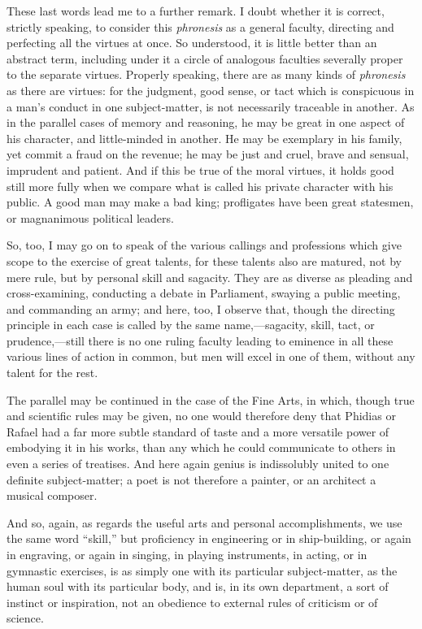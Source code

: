 These last words lead me to a further remark. I doubt whether it is
correct, strictly speaking, to consider this \emph{phronesis} as a
general faculty, directing and perfecting all the virtues at once. So
understood, it is little better than an abstract term, including under
it a circle of analogous faculties severally proper to the separate
virtues. Properly speaking, there are as many kinds of \emph{phronesis}
as there are virtues: for the judgment, good sense, or tact
which is conspicuous in a man's conduct in one subject-matter, is not
necessarily traceable in another. As in the parallel cases of memory
and reasoning, he may be great in one aspect of his character, and
little-minded in another. He may be exemplary in his family, yet
commit a fraud on the revenue; he may be just and cruel, brave and
sensual, imprudent and patient. And if this be true of the moral
virtues, it holds good still more fully when we compare what is called
his private character with his public. A good man may make a bad king;
profligates have been great statesmen, or magnanimous political
leaders.

So, too, I may go on to speak of the various callings and
professions which give scope to the exercise of great talents, for
these talents also are matured, not by mere rule, but by personal
skill and sagacity. They are as diverse as pleading and
cross-examining, conducting a debate in Parliament, swaying a public
meeting, and commanding an army; and here, too, I observe that, though
the directing principle in each case is called by the same name,—sagacity,
skill, tact, or prudence,—still there is no one ruling faculty
leading to eminence in all these various lines of action in common,
but men will excel in one of them, without any talent for the rest.

The parallel may be continued in the case of the Fine Arts, in
which, though true and scientific rules may be given, no one would
therefore deny that Phidias or Rafael had a far more subtle standard
of taste and a more versatile power of embodying it in his works, than any which he could communicate to others in even a series
of treatises. And here again genius is indissolubly united to one
definite subject-matter; a poet is not therefore a painter, or an
architect a musical composer.

And so, again, as regards the useful arts and personal
accomplishments, we use the same word ``skill,'' but
proficiency in engineering or in ship-building, or again in engraving,
or again in singing, in playing instruments, in acting, or in
gymnastic exercises, is as simply one with its particular
subject-matter, as the human soul with its particular body, and is, in
its own department, a sort of instinct or inspiration, not an
obedience to external rules of criticism or of science.

